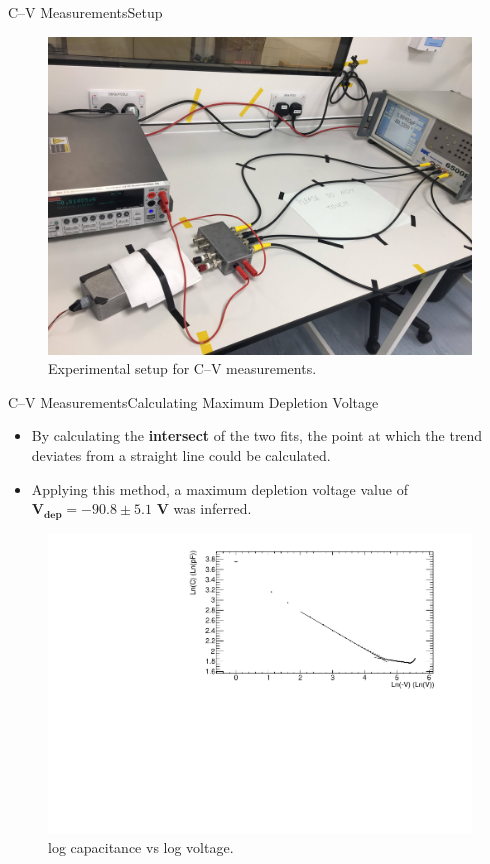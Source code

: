 \documentclass{beamer}
\begin{document}
    \begin{frame}{C--V Measurements}{Setup}
        \begin{figure}
            \centering
            \includegraphics[width = 0.7\linewidth]{CVSetup.jpg}
            \caption{Experimental setup for C--V measurements.}
            \label{fig:CVSetup}
        \end{figure}
    \end{frame}
    
    \begin{frame}{C--V Measurements}{Calculating Maximum Depletion Voltage}
        \begin{itemize}
            \item By calculating the \textbf{intersect} of the two fits, the point at which the trend deviates from a straight line could be calculated.
            \vspace{0.3cm}
            \item Applying this method, a maximum depletion voltage value of $\bm{V_{dep} = -90.8 \pm 5.1}$ \textbf{V} was inferred. 
        \end{itemize}
        \begin{figure}
            \centering
            \includegraphics[width = 0.7\linewidth]{Diode2_nonirradiated_CV_noextrapolation_1711.pdf}
            \vspace{-0.4cm}
            \caption{log capacitance vs log voltage.}
            \label{fig:CVNonIrradiated}
        \end{figure}
    \end{frame}
    
\end{document}
